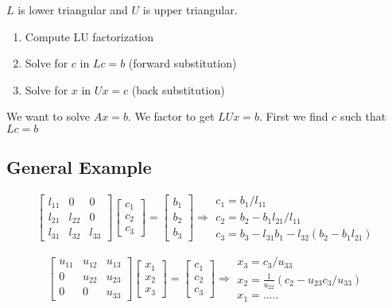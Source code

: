 \documentclass[12pt]{article}
\newcommand{\<}{\langle}
\renewcommand{\>}{\rangle}
\begin{document}
$L$ is lower triangular and $U$ is upper triangular.

\begin{enumerate}
	\item Compute LU factorization
	\item Solve for $c$ in $Lc = b$ (forward substitution)
	\item Solve for $x$ in $Ux = c$ (back substitution)
\end{enumerate}

We want to solve $Ax=b$. We factor to get $LUx =b$. First we find $c$ such that $Lc = b$

\subsection{General Example}
\[
	\begin{bmatrix}
		l_{11} & 0 & 0 \\
		l_{21} & l_{22} & 0 \\
		l_{31} & l_{32} & l_{33}
	\end{bmatrix}
	\begin{bmatrix}
		c_1 \\ c_2 \\ c_3
	\end{bmatrix} = 
	\begin{bmatrix}
		b_1 \\ b_2 \\ b_3
	\end{bmatrix} \Rightarrow
	\begin{matrix}
		c_1 = b_1 / l_{11} \\
		c_2 = b_2 - b_1 l_{21}/ l_{11} \\
		c_3 = b_3 - l_{31}b_1 - l_{32}(b_2 - b_1 l_{21})
	\end{matrix}
\]

\[
	\begin{bmatrix}
		u_{11} & u_{12} & u_{13} \\
		0 & u_{22} & u_{23} \\
		0 & 0 & u_{33}
	\end{bmatrix}
	\begin{bmatrix}
		x_1 \\ x_2 \\ x_3
	\end{bmatrix} = 
	\begin{bmatrix}
		c_1 \\ c_2 \\ c_3
	\end{bmatrix} \Rightarrow
	\begin{matrix}
		x_3 = c_3/u_{33} \\
		x_2 = \frac{1}{u_{22}}(c_2 - u_{23}c_3/u_{33})\\
		x_1 = .....
	\end{matrix}
\]
\end{document}
